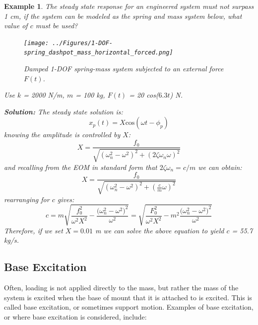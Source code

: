 \documentclass[12pt,letter]{article}
\newtheorem{ex}{Example}
\numberwithin{ex}{section} %
\newenvironment{example}{\begin{mdframed}[middlelinewidth=0.5mm]\begin{ex}\normalfont}{\end{ex}\end{mdframed}}
\numberwithin{re}{section} %
\begin{document}
\begin{example}

		

			The steady state response for an engineered system must not surpass 1 cm, if the system can be modeled as the spring and mass system below, what value of $c$ must be used?  
			\begin{figure}[H]
				\centering
				\texttt{[image: ../Figures/1-DOF-spring\_dashpot\_mass\_horizontal\_forced.png]}
				\caption{Damped 1-DOF spring-mass system subjected to an external force $F(t)$.}
			\end{figure}	
			\noindent Use $k$ = 2000 N/m, $m$ = 100 kg, $F(t)$ = 20 cos($6.3t$) N. 			

			\noindent\textbf{Solution:} The steady state solution is:
			\begin{equation}
				x_p(t) = X \text{cos}(\omega t - \phi_p)
			\end{equation}			 
			knowing the amplitude is controlled by $X$: 
			\begin{equation}
				X = \frac{f_0}{\sqrt{(\omega_n^2 - \omega^2)^2 +  (2\zeta \omega_n \omega)^2}} 
			\end{equation}	
			and recalling from the EOM in standard form that $2\zeta \omega_n = c/m$ we can obtain:
			\begin{equation}
				X = \frac{f_0}{\sqrt{(\omega_n^2 - \omega^2)^2 +  (\frac{c}{m} \omega)^2}} 
			\end{equation}		
			rearranging for $c$ gives:		
			\begin{equation}
				c = m\sqrt{\frac{f_0^2}{\omega^2 X^2}-\frac{\big(\omega_n^2-\omega^2\big)^2}{\omega^2}} = \sqrt{\frac{F_0^2}{\omega^2 X^2}-m^2\frac{\big(\omega_n^2-\omega^2\big)^2}{\omega^2}} 
			\end{equation}
			Therefore, if we set $X=0.01$ m we can solve the above equation to yield $c$ = 55.7 kg/s.
			
\end{example}	


	
		\subsection{Base Excitation}

			Often, loading is not applied directly to the mass, but rather the mass of the system is excited when the base of mount that it is attached to is excited. This is called base excitation, or sometimes support motion. Examples of base excitation, or where base excitation is considered, include:
			
\end{document}
